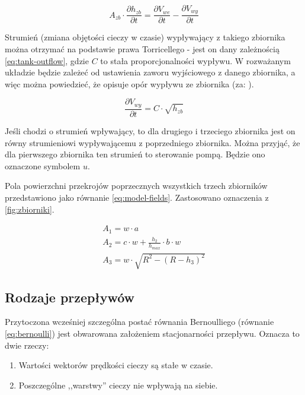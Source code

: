 \begin{equation}\label{eq:tank-mass-balance}
    A_{zb} \cdot \frac{\partial h_{zb}}{\partial t} = \frac{\partial V_{we}}{\partial t} - \frac{\partial V_{wy}}{\partial t}
\end{equation}

Strumień (zmiana objętości cieczy w czasie) wypływający z takiego zbiornika można otrzymać na podstawie prawa Torricellego - jest on dany zależnością \ref{eq:tank-outflow}, gdzie $C$ to stała proporcjonalności wypływu. W rozważanym układzie będzie zależeć od ustawienia zaworu wyjściowego z danego zbiornika, a więc można powiedzieć, że opisuje opór wypływu ze zbiornika (za: \cite{TanksManual}).

\begin{equation}\label{eq:tank-outflow}
\frac{\partial V_{wy}}{\partial t} = C\cdot\sqrt{h_{zb}}
\end{equation}

Jeśli chodzi o strumień wpływający, to dla drugiego i trzeciego zbiornika jest on równy strumieniowi wypływającemu z poprzedniego zbiornika. Można przyjąć, że dla pierwszego zbiornika ten strumień to sterowanie pompą. Będzie ono oznaczone symbolem $u$.

Pola powierzchni przekrojów poprzecznych wszystkich trzech zbiorników przedstawiono jako równanie \ref{eq:model-fields}. Zastosowano oznaczenia z \ref{fig:zbiorniki}.

\begin{equation}\label{eq:model-fields}
    \begin{array}{lr}
        A_{1} = w \cdot a \\
        A_{2} = c\cdot w + \frac{h_{2}}{h_{max}}\cdot b\cdot w \\
        A_{3} = w\cdot \sqrt{R^{2} - (R - h_{3})^{2}}
    \end{array}
\end{equation}

\subsection{Rodzaje przepływów}
\label{sub:plyny-przeplywy}

Przytoczona wcześniej szczególna postać równania Bernoulliego (równanie \ref{eq:bernoulli}) jest obwarowana założeniem stacjonarności przepływu. Oznacza to dwie rzeczy:
\begin{enumerate}
    \item Wartości wektorów prędkości cieczy są stałe w czasie.
    \item Poszczególne ,,warstwy'' cieczy nie wpływają na siebie.
\end{enumerate}

